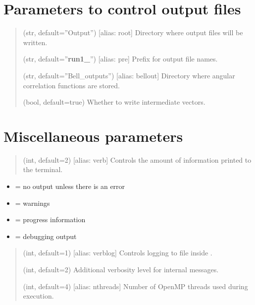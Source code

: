 \documentclass[letterpaper,10pt,english]{sphinxmanual}
\begin{document}
\section{Parameters to control output files}
\label{\detokenize{params:parameters-to-control-output-files}}\begin{quote}\begin{description}
\sphinxAtStartPar
(str, default=”Output”) {[}alias: root{]} Directory where output files will be written.

\sphinxAtStartPar
(str, default=”{\color{red}\bfseries{}run1\_}”) {[}alias: pre{]} Prefix for output file names.

\sphinxAtStartPar
(str, default=”Bell\_outputs”) {[}alias: bellout{]} Directory where angular correlation functions are stored.

\sphinxAtStartPar
(bool, default=true) Whether to write intermediate vectors.

\end{description}\end{quote}


\section{Miscellaneous parameters}
\label{\detokenize{params:miscellaneous-parameters}}\begin{quote}\begin{description}
\sphinxAtStartPar
(int, default=2) {[}alias: verb{]} Controls the amount of information printed to the terminal.

\end{description}\end{quote}
\begin{itemize}
\item {} 
 = no output unless there is an error

\item {} 
 = warnings

\item {} 
 = progress information

\item {} 
 = debugging output

\end{itemize}
\begin{quote}\begin{description}
\sphinxAtStartPar
(int, default=1) {[}alias: verblog{]} Controls logging to file inside .

\sphinxAtStartPar
(int, default=2) Additional verbosity level for internal messages.

\sphinxAtStartPar
(int, default=4) {[}alias: nthreads{]} Number of OpenMP threads used during execution.

\end{description}\end{quote}
\end{document}
